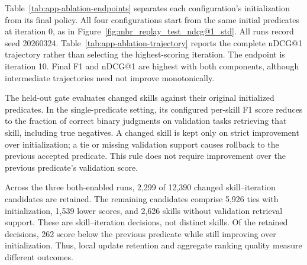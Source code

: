 Table~\ref{tab:app-ablation-endpoints} separates each configuration's initialization from its final policy. All four configurations start from the same initial predicates at iteration 0, as in Figure~\ref{fig:mbr_replay_test_ndcg@1_std}. All runs record seed 20260324. Table~\ref{tab:app-ablation-trajectory} reports the complete nDCG@1 trajectory rather than selecting the highest-scoring iteration. The endpoint is iteration 10. Final F1 and nDCG@1 are highest with both components, although intermediate trajectories need not improve monotonically.



The held-out gate evaluates changed skills against their original initialized predicates. In the single-predicate setting, its configured per-skill F1 score reduces to the fraction of correct binary judgments on validation tasks retrieving that skill, including true negatives. A changed skill is kept only on strict improvement over initialization; a tie or missing validation support causes rollback to the previous accepted predicate. This rule does not require improvement over the previous predicate's validation score.

Across the three both-enabled runs, 2,299 of 12,390 changed skill--iteration candidates are retained. The remaining candidates comprise 5,926 ties with initialization, 1,539 lower scores, and 2,626 skills without validation retrieval support. These are skill--iteration decisions, not distinct skills. Of the retained decisions, 262 score below the previous predicate while still improving over initialization. Thus, local update retention and aggregate ranking quality measure different outcomes.
